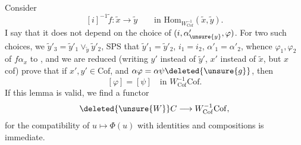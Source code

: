 Consider 
\[
[i]^{-1}\tilde f:\tilde x\longrightarrow\tilde y\qquad\text{in }\mathrm{Hom}_{W_{\mathrm{Cof}}^{-1}}(\tilde x,\tilde y).
\]
I say that it does not depend on the choice of $(i,\alpha'_{\unsure{y}},\varphi)$. For two such choices, we
 $\tilde y'_3=\tilde y'_1\vee_{\tilde y}\tilde y'_2$,
SPS that $\tilde y'_1=\tilde y'_2$, $i_1=i_2$, $\alpha'_1=\alpha'_2$, whence  $\varphi_1,\varphi_2$ of $f\alpha_x$ to ,  and we are reduced (writing $y'$ instead of $\tilde y'$, $x'$ instead of $\tilde x$, but $x$ cof)
prove that if $x',y'\in\mathrm{Cof}$, and $\alpha\varphi=\alpha\psi\deleted{\unsure{g}}$, then
\[
[\varphi]=[\psi]\quad\text{in } W_{\mathrm{Cof}}^{-1}\mathrm{Cof}.
\]
If this lemma is valid, we find a functor
\[
\deleted{\unsure{W}}C\longrightarrow W_{\mathrm{Cof}}^{-1}\mathrm{Cof},
\]
for the compatibility of $u\mapsto\Phi(u)$ with identities and compositions is immediate.
